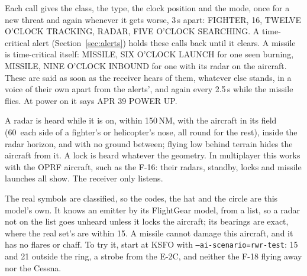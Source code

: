 \documentclass[11pt,a4paper,oneside]{book}
\newcommand{\key}[1]{\texttt{#1}}
\newcommand{\ann}[1]{\textsf{#1}}
\begin{document}
Each call gives the class, the type, the clock position and the mode, once for a new threat and again whenever it gets
worse, 3\,s apart: \ann{FIGHTER, 16, TWELVE O'CLOCK TRACKING}, \ann{RADAR, FIVE O'CLOCK SEARCHING}. A time-critical
alert (Section~\ref{sec:alerts}) holds these calls back until it clears. A missile is time-critical itself:
\ann{MISSILE, SIX O'CLOCK LAUNCH} for one seen burning, \ann{MISSILE, NINE O'CLOCK INBOUND} for one with its radar on the
aircraft. These are said as soon as the receiver hears of them, whatever else stands, in a voice of their own apart from
the alerts', and again every 2.5\,s while the missile flies. At power on it says \ann{APR 39 POWER UP}.

A radar is heard while it is on, within 150\,NM, with the aircraft in its field (60\textdegree\ each side of a fighter's
or helicopter's nose, all round for the rest), inside the radar horizon, and with no ground between; flying low behind
terrain hides the aircraft from it. A lock is heard whatever the geometry. In multiplayer this works with the OPRF
aircraft, such as the F-16: their radars, standby, locks and missile launches all show. The receiver only listens.
\begin{note}
The real symbols are classified, so the codes, the hat and the circle are this model's own. It knows an
emitter by its FlightGear model, from a list, so a radar not on the list goes unheard unless it locks the aircraft; its
bearings are exact, where the real set's are within 15\textdegree. A missile cannot damage this aircraft, and it has no
flares or chaff. To try it, start at KSFO with \key{--ai-scenario=rwr-test}: \ann{15} and \ann{21} outside the ring, a
strobe from the E-2C, and neither the F-18 flying away nor the Cessna.
\end{note}
\end{document}
